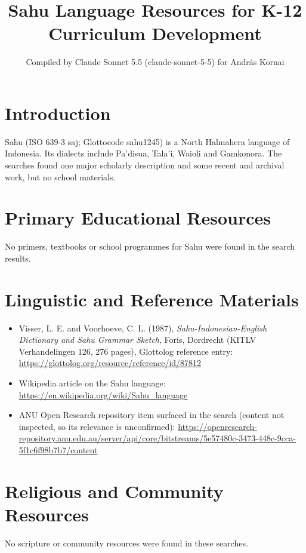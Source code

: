 \documentclass[12pt]{article}
\title{Sahu Language Resources for K-12 Curriculum Development}
\author{Compiled by Claude Sonnet 5.5 (claude-sonnet-5-5) for Andr\'as Kornai}
\date{}
\begin{document}
\maketitle

\section{Introduction}
Sahu (ISO 639-3 saj; Glottocode sahu1245) is a North Halmahera language of Indonesia. Its dialects include Pa'disua, Tala'i, Waioli and Gamkonora. The searches found one major scholarly description and some recent and archival work, but no school materials.

\section{Primary Educational Resources}
No primers, textbooks or school programmes for Sahu were found in the search results.

\section{Linguistic and Reference Materials}
\begin{itemize}
\item Visser, L. E. and Voorhoeve, C. L. (1987), \emph{Sahu-Indonesian-English Dictionary and Sahu Grammar Sketch}, Foris, Dordrecht (KITLV Verhandelingen 126, 276 pages), Glottolog reference entry: \url{https://glottolog.org/resource/reference/id/87812}
\item Wikipedia article on the Sahu language: \url{https://en.wikipedia.org/wiki/Sahu_language}
\item ANU Open Research repository item surfaced in the search (content not inspected, so its relevance is unconfirmed): \url{https://openresearch-repository.anu.edu.au/server/api/core/bitstreams/5e57480c-3473-448c-9cca-5f1c6f98b7b7/content}
\end{itemize}

\section{Religious and Community Resources}
No scripture or community resources were found in these searches.
\end{document}
